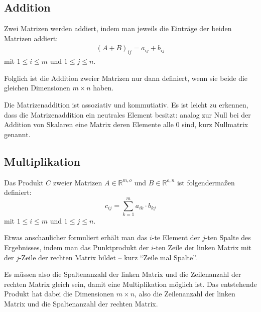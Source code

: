 \subsection{Addition}
Zwei Matrizen werden addiert, indem man jeweils die Einträge der beiden Matrizen addiert:
\begin{align}
 (A + B)_{ij} = a_{ij} + b_{ij}%
\end{align}
mit $1 \leq i \leq m$ und $1 \leq j \leq n$.

Folglich ist die Addition zweier Matrizen nur dann definiert, wenn sie beide die gleichen Dimensionen $m \times n$ haben.

Die Matrizenaddition ist assoziativ und kommutiativ. Es ist leicht zu erkennen, dass die Matrizenaddition ein neutrales Element besitzt: analog zur Null bei der Addition von Skalaren eine Matrix deren Elemente alle 0 sind, kurz Nullmatrix genannt.

\subsection{Multiplikation}
Das Produkt $C$ zweier Matrizen $A \in \mathbb R^{m,o}$ und $B \in \mathbb R^{o,n}$ ist folgendermaßen definiert:
\begin{equation}
 c_{ij} = \sum_{k=1}^m{a_{ik} \cdot b_{kj}}
\end{equation}
mit $1 \leq i \leq m$ und $1 \leq j \leq n$.

Etwas anschaulicher formuliert erhält man das $i$-te Element der $j$-ten Spalte des Ergebnisses, indem man das Punktprodukt der $i$-ten Zeile der linken Matrix mit der $j$-Zeile der rechten Matrix bildet -- kurz \enquote{Zeile mal Spalte}.

Es müssen also die Spaltenanzahl der linken Matrix und die Zeilenanzahl der rechten Matrix gleich sein, damit eine Multiplikation möglich ist. Das entstehende Produkt hat dabei die Dimensionen $m \times n$, also die Zeilenanzahl der linken Matrix und die Spaltenanzahl der rechten Matrix.

